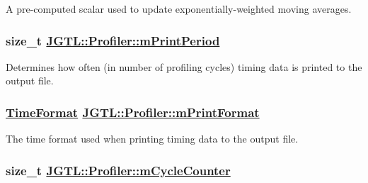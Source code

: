 A pre-computed scalar used to update exponentially-weighted moving averages. \hypertarget{class_j_g_t_l_1_1_profiler_de2b79bbd0a6845cf50a47435cb5265b}{
\subsubsection[mPrintPeriod]{\setlength{\rightskip}{0pt plus 5cm}size\_\-t \hyperlink{class_j_g_t_l_1_1_profiler_de2b79bbd0a6845cf50a47435cb5265b}{JGTL::Profiler::m\-Print\-Period}}}
\label{class_j_g_t_l_1_1_profiler_de2b79bbd0a6845cf50a47435cb5265b}


Determines how often (in number of profiling cycles) timing data is printed to the output file. \hypertarget{class_j_g_t_l_1_1_profiler_98b7dbee91f283a2f2a958e9f0acc4c4}{
\subsubsection[mPrintFormat]{\setlength{\rightskip}{0pt plus 5cm}\hyperlink{namespace_j_g_t_l_11a34d88ecadd1c99354adc21fd5abe6}{Time\-Format} \hyperlink{class_j_g_t_l_1_1_profiler_98b7dbee91f283a2f2a958e9f0acc4c4}{JGTL::Profiler::m\-Print\-Format}}}
\label{class_j_g_t_l_1_1_profiler_98b7dbee91f283a2f2a958e9f0acc4c4}


The time format used when printing timing data to the output file. 

\hypertarget{class_j_g_t_l_1_1_profiler_77a79635f96581b9038410277fb1be34}{
\subsubsection[mCycleCounter]{\setlength{\rightskip}{0pt plus 5cm}size\_\-t \hyperlink{class_j_g_t_l_1_1_profiler_77a79635f96581b9038410277fb1be34}{JGTL::Profiler::m\-Cycle\-Counter}}}
\label{class_j_g_t_l_1_1_profiler_77a79635f96581b9038410277fb1be34}


